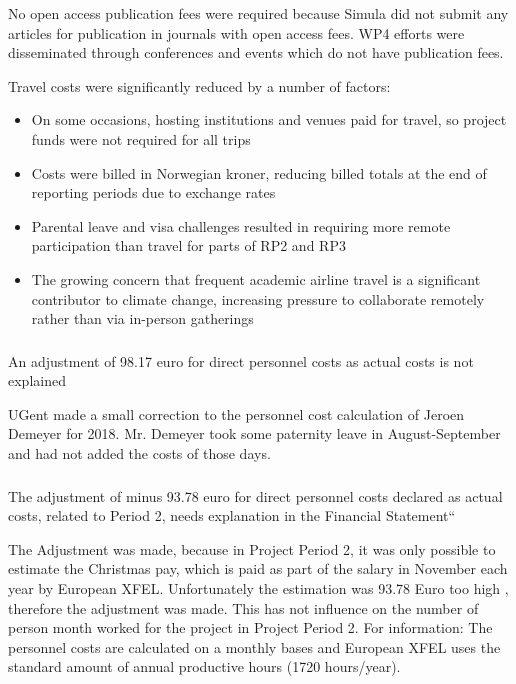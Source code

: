 \begin{itemize}
No open access publication fees were required because Simula did not submit any articles for publication in journals with open access fees.
WP4 efforts were disseminated through conferences and events which do not have publication fees.

Travel costs were significantly reduced by a number of factors:
\begin{itemize}
  \item On some occasions, hosting institutions and venues paid for travel, so project funds were not required for all trips
  \item Costs were billed in Norwegian kroner, reducing billed totals at the end of reporting periods due to exchange rates
  \item Parental leave and visa challenges resulted in requiring more remote participation
    than travel for parts of RP2 and RP3
  \item The growing concern that frequent academic airline travel is a significant contributor to climate change,
    increasing pressure to collaborate remotely rather than via in-person gatherings
\end{itemize}

\subsubsection{}
\begin{EUcomment}
An adjustment of 98.17 euro for direct personnel costs as actual costs is not explained 
\end{EUcomment}
UGent made a small correction to the personnel cost calculation of Jeroen Demeyer for 2018. Mr. Demeyer took some paternity leave in August-September and had not added the costs of those days.

\subsubsection{}

\begin{EUcomment}
The adjustment of minus 93.78 euro for direct personnel costs declared as actual costs, related to Period 2, needs explanation in the 
Financial Statement“
\end{EUcomment}

The Adjustment was made, because in Project Period 2, it was only possible to estimate the Christmas pay, which is paid as part of the salary in November each year by European XFEL. Unfortunately the estimation was 93.78 Euro too high , therefore the adjustment was made. This has not influence on the number of person month worked for the project in Project Period 2. For information: The personnel costs are calculated on a monthly bases and European XFEL uses the standard amount of  annual productive hours (1720 hours/year).


\end{itemize}
